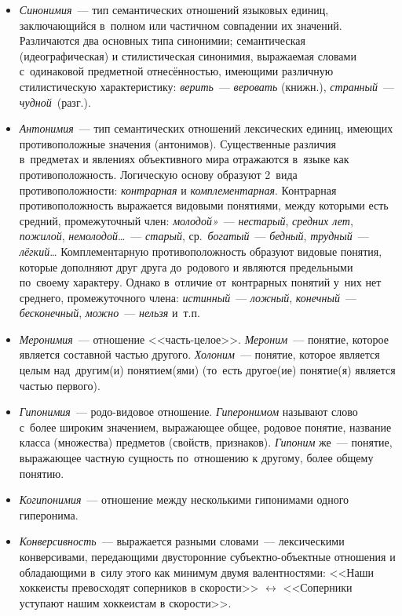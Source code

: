 \documentclass[12pt]{article}
\theoremstyle{definition}
\theoremstyle{remark}
\numberwithin{equation}{section}
\begin{document}
\begin{itemize}
	\item \textsl{Синонимия}~--- тип семантических отношений языковых
    единиц, заключающийся в~полном или частичном совпадении их значений.
    Различаются два основных типа синонимии; семантическая
    (идеографическая) и стилистическая синонимия, выражаемая
    словами с~одинаковой предметной отнесённостью, имеющими
    различную стилистическую характеристику: \textit{верить}~---
    \textit{веровать} (книжн.), \textit{странный}~--- \textit{чудной}~(разг.).
	\item \textsl{Антонимия}~--- тип семантических отношений лексических
    единиц, имеющих противоположные значения (антонимов). Существенные
    различия в~предметах и явлениях объективного мира отражаются
    в~языке как противоположность. Логическую основу образуют
    2~вида противоположности: \textsl{контрарная} и
    \textsl{комплементарная}. Контрарная противоположность
    выражается видовыми понятиями, между которыми есть средний,
    промежуточный член: \textit{молодой»}~--- \textit{нестарый},
    \textit{средних лет}, \textit{пожилой}, \textit{немолодой}\dots~---
    \textit{старый}, ср.~\textit{богатый}~--- \textit{бедный},
    \textit{трудный}~--- \textit{лёгкий}\dots
    Комплементарную противоположность образуют видовые понятия,
    которые дополняют друг друга до~родового и являются предельными
    по~своему характеру. Однако в~отличие от~контрарных понятий
    у~них нет среднего, промежуточного члена: \textit{истинный}~---
    \textit{ложный}, \textit{конечный}~--- \textit{бесконечный},
    \textit{можно}~--- \textit{нельзя} и~т.п.
	\item \textsl{Меронимия}~--- отношение <<часть-целое>>.
    \textsl{Мероним}~--- понятие, которое является составной частью
    другого. \textsl{Холоним}~--- понятие, которое является целым
    над~другим(и) понятием(ями) (то~есть другое(ие) понятие(я)
    является частью первого).
	\item \textsl{Гипонимия}~--- родо-видовое отношение.
    \textsl{Гиперонимом} называют слово с~более широким значением,
    выражающее общее, родовое понятие, название класса (множества)
    предметов (свойств, признаков). \textsl{Гипоним} же~--- понятие,
    выражающее частную сущность по~отношению к другому, более
    общему понятию.
	\item \textsl{Когипонимия}~--- отношение между несколькими
    гипонимами одного гиперонима.
	\item \textsl{Конверсивность}~--- выражается разными
    словами~--- лексическими конверсивами, передающими двусторонние
    субъектно-объектные отношения и обладающими в~силу этого
    как минимум двумя валентностями: <<Наши хоккеисты превосходят
    соперников в скорости>> $\leftrightarrow$ <<Соперники уступают
    нашим хоккеистам в скорости>>.
\end{itemize}
\end{document}
